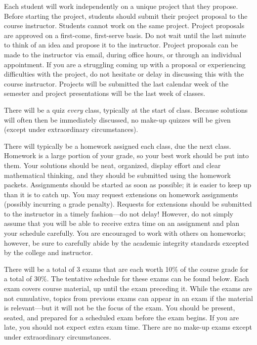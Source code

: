 \documentclass[11pt,letterpaper]{article}
\begin{document}
Each student will work independently on a unique project that they propose. Before starting the project, students should submit their project proposal to the course instructor. Students cannot work on the same project. Project proposals are approved on a first-come, first-serve basis. Do not wait until the last minute to think of an idea and propose it to the instructor. Project proposals can be made to the instructor via email, during office hours, or through an individual appointment. If you are a struggling coming up with a proposal or experiencing difficulties with the project, do not hesitate or delay in discussing this with the course instructor. Projects will be submitted the last calendar week of the semester and project presentations will be the last week of classes. \pspace


There will be a quiz \textit{every} class, typically at the start of class. Because solutions will often then be immediately discussed, no make-up quizzes will be given (except under extraordinary circumstances). \pspace


There will typically be a homework assigned each class, due the next class. Homework is a large portion of your grade, so your best work should be put into them. Your solutions should be neat, organized, display effort and clear mathematical thinking, and they should be submitted using the homework packets. Assignments should be started as soon as possible; it is easier to keep up than it is to catch up. You may request extensions on homework assignments (possibly incurring a grade penalty). Requests for extensions should be submitted to the instructor in a timely fashion---do not delay! However, do not simply assume that you will be able to receive extra time on an assignment and plan your schedule carefully. You are encouraged to work with others on homeworks; however, be sure to carefully abide by the academic integrity standards excepted by the college and instructor. \pspace


There will be a total of 3 exams that are each worth 10\% of the course grade for a total of 30\%. The tentative schedule for these exams can be found below. Each exam covers course material, up until the exam preceding it. While the exams are not cumulative, topics from previous exams can appear in an exam if the material is relevant---but it will not be the focus of the exam. You should be present, seated, and prepared for a scheduled exam before the exam begins. If you are late, you should not expect extra exam time. There are no make-up exams except under extraordinary circumstances. \pspace
\end{document}
